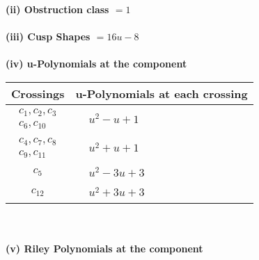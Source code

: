 \documentclass[1p]{elsarticle_modified}
\theoremstyle{definition}
\begin{document}
\flushleft \textbf{(ii) Obstruction class $= 1$}\\~\\
\flushleft \textbf{(iii) Cusp Shapes $= 16 u-8$}\\~\\
\newpage\renewcommand{\arraystretch}{1}
\flushleft \textbf{(iv) u-Polynomials at the component}\newline \\
\begin{tabular}{m{50pt}|m{274pt}}
Crossings & \hspace{64pt}u-Polynomials at each crossing \\
\hline $$\begin{aligned}c_{1},c_{2},c_{3}\\c_{6},c_{10}\end{aligned}$$&$\begin{aligned}
&u^2- u+1
\end{aligned}$\\
\hline $$\begin{aligned}c_{4},c_{7},c_{8}\\c_{9},c_{11}\end{aligned}$$&$\begin{aligned}
&u^2+u+1
\end{aligned}$\\
\hline $$\begin{aligned}c_{5}\end{aligned}$$&$\begin{aligned}
&u^2-3 u+3
\end{aligned}$\\
\hline $$\begin{aligned}c_{12}\end{aligned}$$&$\begin{aligned}
&u^2+3 u+3
\end{aligned}$\\
\hline
\end{tabular}\\~\\
\newpage\renewcommand{\arraystretch}{1}
\flushleft \textbf{(v) Riley Polynomials at the component}\newline \\
\end{document}
